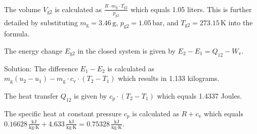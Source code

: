 The volume \( V_{\text{g2}} \) is calculated as \( \frac{R \cdot m_{\text{g}} \cdot T_{\text{g2}}}{p_{\text{g2}}} \) which equals 1.05 liters. This is further detailed by substituting \( m_{\text{g}} = 3.46 \, \text{g} \), \( p_{\text{g2}} = 1.05 \, \text{bar} \), and \( T_{\text{g2}} = 273.15 \, \text{K} \) into the formula.

The energy change \( E_{\text{g2}} \) in the closed system is given by \( E_2 - E_1 = Q_{12} - W_{\text{v}} \).

Solution: The difference \( E_1 - E_2 \) is calculated as \( m_{\text{g}} (u_2 - u_1) - m_{\text{g}} \cdot c_{\text{v}} \cdot (T_2 - T_1) \) which results in 1.133 kilograms.

The heat transfer \( Q_{12} \) is given by \( c_p \cdot (T_2 - T_1) \) which equals 1.4337 Joules.

The specific heat at constant pressure \( c_p \) is calculated as \( R + c_{\text{v}} \) which equals \( 0.16628 \, \frac{\text{kJ}}{\text{kg} \cdot \text{K}} + 4.633 \, \frac{\text{kJ}}{\text{kg} \cdot \text{K}} = 0.75328 \, \frac{\text{kJ}}{\text{kg} \cdot \text{K}} \).